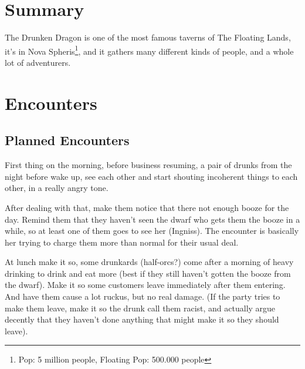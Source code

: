 


\section{Summary}
The Drunken Dragon is one of the most famous taverns of The Floating Lands, it's in Nova Spheris\footnote{Pop: 5 million people, Floating Pop: 500.000 people}, and it gathers many different kinds of people, and a whole lot of adventurers.
\section{Encounters}
\subsection{Planned Encounters}
First thing on the morning, before business resuming, a pair of drunks from the night before wake up, see each other and start shouting incoherent things to each other, in a really angry tone.

After dealing with that, make them notice that there not enough booze for the day. Remind them that they haven't seen the dwarf who gets them the booze in a while, so at least one of them goes to see her (Ingniss). The encounter is basically her trying to charge them more than normal for their usual deal.

At lunch make it so, some drunkards (half-orcs?) come after a morning of heavy drinking to drink and eat more (best if they still haven't gotten the booze from the dwarf). Make it so some customers leave immediately after them entering. And have them cause a lot ruckus, but no real damage. (If the party tries to make them leave, make it so the drunk call them racist, and actually argue decently that they haven't done anything that might make it so they should leave).




